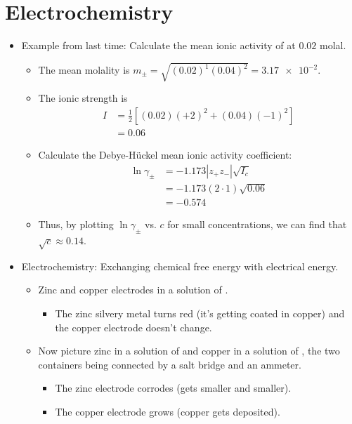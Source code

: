 \documentclass[../notes.tex]{subfiles}
\begin{document}
\section{Electrochemistry}
\begin{itemize}
    \item {}Example from last time: Calculate the mean ionic activity of  at $0.02$ molal.
    \begin{itemize}
        \item The mean molality is $m_\pm=\sqrt{(0.02)^1(0.04)^2}=\num{3.17e-2}$.
        \item The ionic strength is
        \begin{align*}
            I &= \frac{1}{2}[(0.02)(+2)^2+(0.04)(-1)^2]\\
            &= 0.06
        \end{align*}
        \item Calculate the Debye-H\"{u}ckel mean ionic activity coefficient:
        \begin{align*}
            \ln\gamma_\pm &= -1.173|z_+z_-|\sqrt{I_c}\\
            &= -1.173(2\cdot 1)\sqrt{0.06}\\
            &= -0.574
        \end{align*}
        \item Thus, by plotting $\ln\gamma_\pm$ vs. $c$ for small concentrations, we can find that $\sqrt{c}\approx 0.14$.
    \end{itemize}
    \item Electrochemistry: Exchanging chemical free energy with electrical energy.
    \begin{itemize}
        \item Zinc and copper electrodes in a solution of .
        \begin{itemize}
            \item The zinc silvery metal turns red (it's getting coated in copper) and the copper electrode doesn't change.
        \end{itemize}
        \item Now picture zinc in a solution of  and copper in a solution of , the two containers being connected by a salt bridge and an ammeter.
        \begin{itemize}
            \item The zinc electrode corrodes (gets smaller and smaller).
            \item The copper electrode grows (copper gets deposited).

\end{itemize}
\end{itemize}
\end{itemize}
\end{document}
